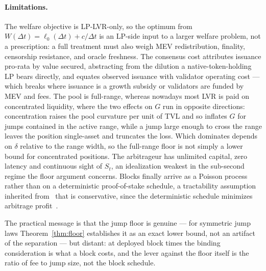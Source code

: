 \documentclass[runningheads]{llncs}
\newcommand{\dt}{\Delta t}
\newcommand{\1}{\mathbf{1}}
\newif\ifextended
\begin{document}
\paragraph{Limitations.}
The welfare objective is LP-LVR-only, so the optimum from $W(\dt) = \ell_0(\dt) + c/\dt$ is an LP-side input to a larger welfare problem, not a prescription: a full treatment must also weigh MEV redistribution, finality, censorship resistance, and oracle freshness. The consensus cost attributes issuance pro-rata by value secured, abstracting from the dilution a native-token-holding LP bears directly, and equates observed issuance with validator operating cost --- which breaks where issuance is a growth subsidy or validators are funded by MEV and fees. The pool is full-range, whereas nowadays most LVR is paid on concentrated liquidity, where the two effects on $G$ run in opposite directions: concentration raises the pool curvature per unit of TVL and so inflates $G$ for jumps contained in the active range, while a jump large enough to cross the range leaves the position single-asset and truncates the loss. Which dominates depends on $\delta$ relative to the range width, so the full-range floor is not simply a lower bound for concentrated positions. The arbitrageur has unlimited capital, zero latency and continuous sight of $S_t$, an idealization weakest in the sub-second regime the floor argument concerns. Blocks finally arrive as a Poisson process rather than on a deterministic proof-of-stake schedule, a tractability assumption inherited from~\cite{milionis2023automated} that is conservative, since the deterministic schedule minimizes arbitrage profit~\cite{nezlobin2025lvr}.

The practical message is that the jump floor is genuine --- for symmetric jump laws Theorem~\ref{thm:floor} establishes it as an exact lower bound, not an artifact of the separation --- but distant: at deployed block times the binding consideration is what a block costs, and the lever against the floor itself is the ratio of fee to jump size, not the block schedule.




\ifextended
\appendix

\fi
\end{document}
